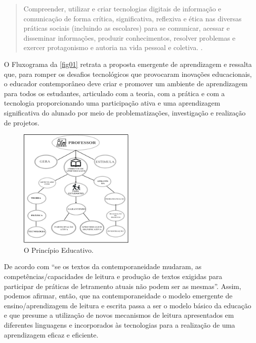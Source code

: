 \documentclass{textolivre}
\begin{document}
\begin{quote}
    Compreender, utilizar e criar tecnologias digitais de informação e comunicação de forma crítica, significativa, reflexiva e ética nas diversas práticas sociais (incluindo as escolares) para se comunicar, acessar e disseminar informações, produzir conhecimentos, resolver problemas e exercer protagonismo e autoria na vida pessoal e coletiva. \cite{brasil_base_2017}.
\end{quote}

O Fluxograma da \cref{fig01} retrata a proposta emergente de aprendizagem e ressalta que, para romper os desafios tecnológicos que provocaram inovações educacionais, o educador contemporâneo deve criar e promover um ambiente de aprendizagem para todos os estudantes, articulado com a teoria, com a prática e com a tecnologia proporcionando uma participação ativa e uma aprendizagem significativa do alunado por meio de problematizações, investigação e realização de projetos. 

\begin{figure}[htbp]
 \centering
 \includegraphics[width=0.5\textwidth]{Fig01.png}
 \caption{O Princípio Educativo.}
 \label{Fig01}
\end{figure}

De acordo com \textcite[p. 8]{rojo_multiletramentos_2012} “se os textos da contemporaneidade mudaram, as competências/capacidades de leitura e produção de textos exigidas para participar de práticas de letramento atuais não podem ser as mesmas”. Assim, podemos afirmar, então, que na contemporaneidade o modelo emergente de ensino/aprendizagem de leitura e escrita passa a ser o modelo básico da educação e que presume a utilização de novos mecanismos de leitura apresentados em diferentes linguagens e incorporados às tecnologias para a realização de uma aprendizagem eficaz e eficiente.  
\end{document}
